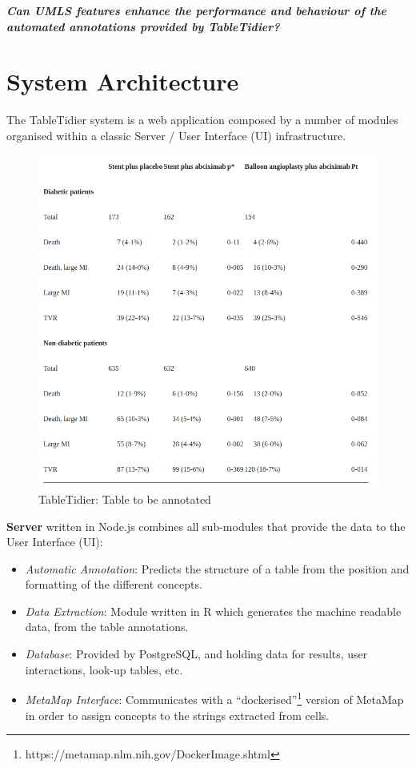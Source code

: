 \documentclass[10.7pt,]{article}
\begin{document}
\begin{center}
\textit{\textbf{Can UMLS features enhance the performance and behaviour of the automated annotations provided by TableTidier?}}
\end{center}


\section{System Architecture}\label{system-architecture}

The TableTidier system is a web application composed by a number of modules organised within a classic Server / User Interface (UI) infrastructure.

\begin{figure}
	\centering
	\includegraphics[width=0.7\linewidth]{screenshot003}
	\caption{TableTidier: Table to be annotated}
	\label{fig:annotator}
\end{figure}

%



\textbf{Server} written in Node.js combines all sub-modules that provide the data to the User Interface (UI):
	\begin{itemize}
		\item \textit{Automatic Annotation}: Predicts the structure of a table from the position and formatting of the different concepts.
		\item \textit{Data Extraction}: Module written in R which generates the machine readable data, from the table annotations.
		\item \textit{Database}: Provided by PostgreSQL, and holding data for results, user interactions, look-up tables, etc.
		\item \textit{MetaMap Interface}: Communicates with a ``dockerised''\footnote{https://metamap.nlm.nih.gov/DockerImage.shtml} version of MetaMap in order to assign concepts to the strings extracted from cells.
	\end{itemize}
	
\end{document}
